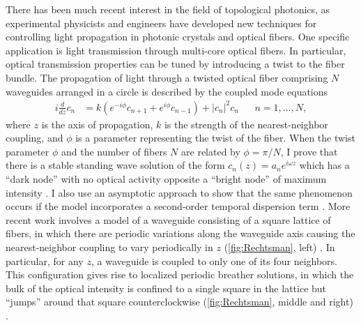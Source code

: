 \documentclass[11pt,reqno,oneside]{article}
\theoremstyle{definition}
\theoremstyle{remark}
\begin{document}
There has been much recent interest in the field of topological photonics, as experimental physicists and engineers have developed new techniques for controlling light propagation in photonic crystals and optical fibers. One specific application is light transmission through multi-core optical fibers. In particular, optical transmission properties can be tuned by introducing a twist to the fiber bundle. The propagation of light through a twisted optical fiber comprising $N$ waveguides arranged in a circle is described by the coupled mode equations
\begin{align*}
i \frac{d}{dz} c_n &= k \left(e^{-i\phi}c_{n+1} + e^{i\phi}c_{n-1}\right) + |c_n|^2 c_n &&  n = 1, \dots, N,
\end{align*}
where $z$ is the axis of propagation, $k$ is the strength of the nearest-neighbor coupling, and $\phi$ is a parameter representing the twist of the fiber. When the twist parameter $\phi$ and the number of fibers $N$ are related by $\phi = \pi/N$, I prove that there is a stable standing wave solution of the form $c_n(z) = a_n e^{i \omega z}$ which has a ``dark node'' with no optical activity opposite a ``bright node'' of maximum intensity \cite{ParkerTwist}. I also use an asymptotic approach to show that the same phenomenon occurs if the model incorporates a second-order temporal dispersion term \cite{ParkerSpatiotemporalTwist}. More recent work involves a model of a waveguide consisting of a square lattice of fibers, in which there are periodic variations along the waveguide axis causing the nearest-neighbor coupling to vary periodically in $z$ (\cref{fig:Rechtsman}, left) \cite{Mukherjee2020}. In particular, for any $z$, a waveguide is coupled to only one of its four neighbors. This configuration gives rise to localized periodic breather solutions, in which the bulk of the optical intensity is confined to a single square in the lattice but ``jumps'' around that square counterclockwise (\cref{fig:Rechtsman}, middle and right) \cite{Parker2021Floquet}. 
\end{document}
